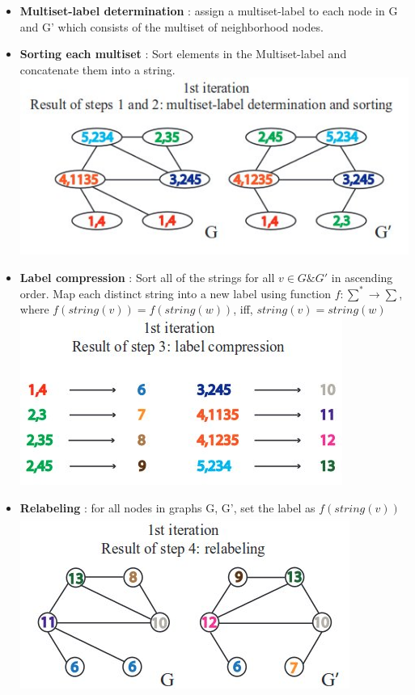 \documentclass[fleqn]{article}
\begin{document}
\begin{itemize}
  \item \textbf{Multiset-label determination} : assign a multiset-label to each node in G and G' which consists of the multiset of neighborhood nodes.
  \item \textbf{Sorting each multiset} :  Sort elements in the Multiset-label and concatenate them into a string.\\
  \includegraphics[scale=0.4]{./pics/labelsfindingandsorting.jpg}
  \item \textbf{Label compression} : Sort all of the strings for all $v \in G \& G'$ in ascending order. Map each distinct string into a new label
  	using function $f: \sum^* \rightarrow \sum$, where $f(string(v)) = f(string(w))$, iff, $string(v) = string(w)$\\
  \includegraphics[scale=0.4]{./pics/compression.jpg}
  \item \textbf{Relabeling} : for all nodes in graphs G, G', set the label as $f(string(v))$\\
  \includegraphics[scale=0.4]{./pics/relabeling.jpg}
  
\end{itemize}
\end{document}
